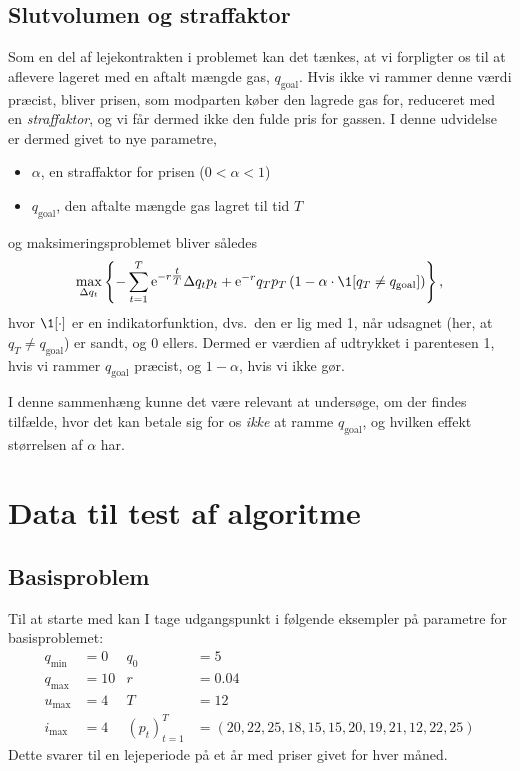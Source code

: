 \documentclass[12pt,a4paper,oneside,final]{article}
\begin{document}
\subsection{Slutvolumen og straffaktor}
Som en del af lejekontrakten i problemet kan det tænkes, at vi forpligter os til at aflevere lageret med en aftalt mængde gas, \(q_{\mathrm{goal}}\).
Hvis ikke vi rammer denne værdi præcist, bliver prisen, som modparten køber den lagrede gas for, reduceret med en \emph{straffaktor}, og vi får dermed ikke den fulde pris for gassen.
I denne udvidelse er dermed givet to nye parametre,
\begin{itemize}
\item \(\alpha\), en straffaktor for prisen (\(0 < \alpha < 1\))
\item \(q_{\mathrm{goal}}\), den aftalte mængde gas lagret til tid \(T\)
\end{itemize}
og maksimeringsproblemet bliver således
\begin{equation}
  \max_{\Delta q_{t}}
  \left\{
    - \sum_{t = 1}^{T} \e^{-r\tfrac{t}{T}} \Delta q_{t} p_{t} + \e^{-r} q_{T}p_{T}
    \left(
      1 - \alpha \cdot \1 [q_{T} \neq q_{\mathrm{goal}}]
    \right)
  \right\} ,
\end{equation}
hvor \(\1[\cdot]\) er en indikatorfunktion, dvs.\ den er lig med 1, når udsagnet (her, at \(q_{T} \neq q_{\mathrm{goal}}\)) er sandt, og 0 ellers.
Dermed er værdien af udtrykket i parentesen 1, hvis vi rammer \(q_{\mathrm{goal}}\) præcist, og \(1 - \alpha\), hvis vi ikke gør.

I denne sammenhæng kunne det være relevant at undersøge, om der findes tilfælde, hvor det kan betale sig for os \emph{ikke} at ramme \(q_{\mathrm{goal}}\), og hvilken effekt størrelsen af \(\alpha\) har.


\clearpage
\section{Data til test af algoritme}

\subsection{Basisproblem}
Til at starte med kan I tage udgangspunkt i følgende eksempler på parametre for basisproblemet:
\begin{align*}
  q_{\min} &= 0 & q_{0} &= 5 \\
  q_{\max} &= 10 & r &= 0.04 \\
  u_{\max} &= 4 &  T &= 12 \\
  i_{\max} &= 4 &  (p_{t})_{t=1}^{T} &= (20, 22, 25, 18, 15, 15, 20, 19, 21, 12, 22, 25)
\end{align*}
Dette svarer til en lejeperiode på et år med priser givet for hver måned.
\end{document}
